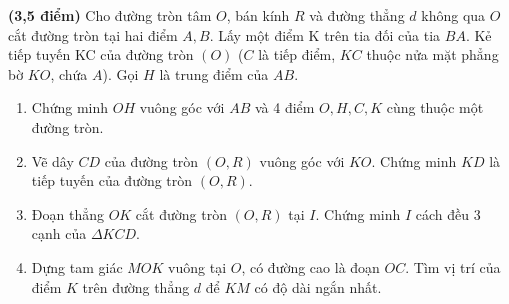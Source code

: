 \begin{ex}{\bf (3,5 điểm)}%
Cho đường tròn tâm $O$, bán kính $R$ và đường thẳng $d$ không qua $O$ cắt đường tròn tại hai điểm $A, B$. Lấy một điểm  K trên tia đối của tia $BA$. Kẻ tiếp tuyến KC của đường tròn $(O)$ ($C$ là tiếp điểm, $KC$ thuộc nửa mặt phẳng bờ $KO$, chứa $A$). Gọi $H$ là trung điểm của $AB$.
\begin{enumerate}
\item Chứng minh $OH$ vuông góc với $AB$ và 4 điểm $O, H, C, K$ cùng thuộc một đường tròn.
\item Vẽ dây $CD$ của đường tròn $(O,R)$ vuông góc với $KO$. Chứng minh $KD$ là tiếp tuyến của đường tròn $(O,R)$.
\item Đoạn thẳng $OK$ cắt đường tròn $(O,R)$ tại $I$. Chứng minh $I$ cách đều 3 cạnh của $\Delta KCD$.
\item Dựng tam giác $MOK$ vuông tại $O$, có đường cao là đoạn $OC$. Tìm vị trí của điểm $K$ trên đường thẳng $d$ để $KM$ có độ dài ngắn nhất.
\end{enumerate}
\loigiai
	{\begin{enumerate}
\end{enumerate}}
\end{ex}
